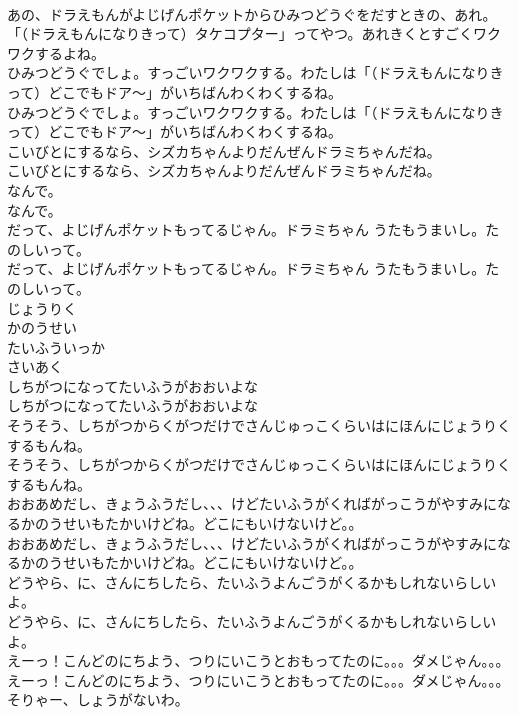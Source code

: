 \documentclass[8pt]{extreport}
\begin{document}
\begin{CJK}{UTF8}{min}
\\	あの、ドラえもんがよじげんポケットからひみつどうぐをだすときの、あれ。「（ドラえもんになりきって）タケコプター」ってやつ。あれきくとすごくワクワクするよね。
\\	ひみつどうぐでしょ。すっごいワクワクする。わたしは「（ドラえもんになりきって）どこでもドア～」がいちばんわくわくするね。
\\	ひみつどうぐでしょ。すっごいワクワクする。わたしは「（ドラえもんになりきって）どこでもドア～」がいちばんわくわくするね。
\\	こいびとにするなら、シズカちゃんよりだんぜんドラミちゃんだね。
\\	こいびとにするなら、シズカちゃんよりだんぜんドラミちゃんだね。
\\	なんで。
\\	なんで。
\\	だって、よじげんポケットもってるじゃん。ドラミちゃん うたもうまいし。たのしいって。
\\	だって、よじげんポケットもってるじゃん。ドラミちゃん うたもうまいし。たのしいって。
\\	じょうりく
\\	かのうせい
\\	たいふういっか
\\	さいあく
\\	しちがつになってたいふうがおおいよな
\\	しちがつになってたいふうがおおいよな
\\	そうそう、しちがつからくがつだけでさんじゅっこくらいはにほんにじょうりくするもんね。
\\	そうそう、しちがつからくがつだけでさんじゅっこくらいはにほんにじょうりくするもんね。
\\	おおあめだし、きょうふうだし、、、けどたいふうがくればがっこうがやすみになるかのうせいもたかいけどね。どこにもいけないけど。。
\\	おおあめだし、きょうふうだし、、、けどたいふうがくればがっこうがやすみになるかのうせいもたかいけどね。どこにもいけないけど。。
\\	どうやら、に、さんにちしたら、たいふうよんごうがくるかもしれないらしいよ。
\\	どうやら、に、さんにちしたら、たいふうよんごうがくるかもしれないらしいよ。
\\	えーっ！こんどのにちよう、つりにいこうとおもってたのに。。。ダメじゃん。。。
\\	えーっ！こんどのにちよう、つりにいこうとおもってたのに。。。ダメじゃん。。。
\\	そりゃー、しょうがないわ。

\end{CJK}
\end{document}
